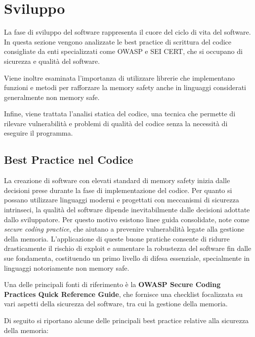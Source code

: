 \section{Sviluppo}
\label{sec:development}

La fase di sviluppo del software rappresenta il cuore del ciclo di vita del software.
In questa sezione vengono analizzate le best practice di scrittura del codice
consigliate da enti specializzati come OWASP e SEI CERT, che si occupano di sicurezza
e qualità del software.

Viene inoltre esaminata l'importanza di utilizzare librerie che implementano funzioni
e metodi per rafforzare la memory safety anche in linguaggi considerati generalmente
non memory safe.

Infine, viene trattata l'analisi statica del codice, una tecnica che permette di
rilevare vulnerabilità e problemi di qualità del codice senza la necessità di eseguire
il programma.

\subsection{Best Practice nel Codice}
\label{sec:best-practices-codice}

La creazione di software con elevati standard di memory safety inizia dalle
decisioni prese durante la fase di implementazione del codice. Per quanto si possano
utilizzare linguaggi moderni e progettati con meccanismi di sicurezza intrinseci,
la qualità del software dipende inevitabilmente dalle decisioni adottate dallo
sviluppatore. Per questo motivo esistono linee guida consolidate, note come
\textit{secure coding practice}, che aiutano a prevenire vulnerabilità legate
alla gestione della memoria. L'applicazione di queste buone pratiche consente di
ridurre drasticamente il rischio di exploit e aumentare la robustezza del software
fin dalle sue fondamenta, costituendo un primo livello di difesa essenziale, specialmente
in linguaggi notoriamente non memory safe.

Una delle principali fonti di riferimento è la \textbf{OWASP Secure Coding
Practices Quick Reference Guide}\cite{owasp_best_practices}, che fornisce una
checklist focalizzata su vari aspetti della sicurezza del software, tra cui la gestione
della memoria.

Di seguito si riportano alcune delle principali best practice relative alla sicurezza
della memoria:

